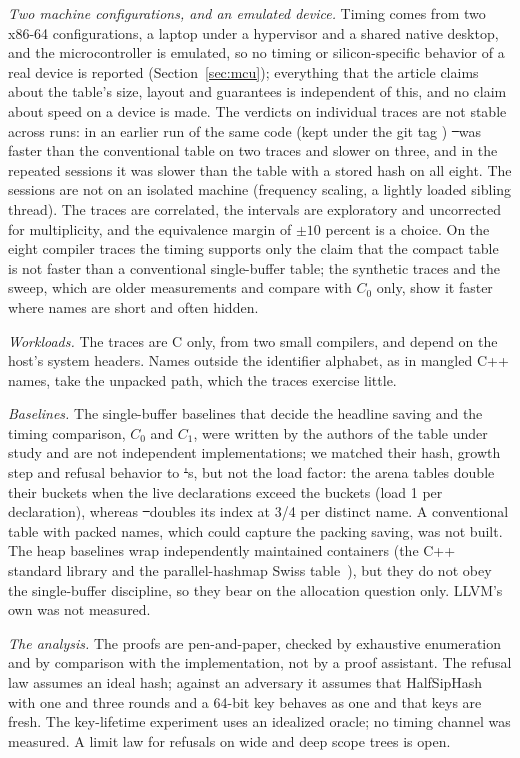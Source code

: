 \emph{Two machine configurations, and an emulated device.} Timing comes from two x86-64 configurations, a laptop under a hypervisor and a shared native desktop, and the microcontroller is emulated, so no timing or silicon-specific behavior of a real device is reported (Section~\ref{sec:mcu}); everything that the article claims about the table's size, layout and guarantees is independent of this, and no claim about speed on a device is made. The verdicts on individual traces are not stable across runs: in an earlier run of the same code (kept under the git tag ) \st\ was faster than the conventional table on two traces and slower on three, and in the repeated sessions it was slower than the table with a stored hash on all eight. The sessions are not on an isolated machine (frequency scaling, a lightly loaded sibling thread). The traces are correlated, the intervals are exploratory and uncorrected for multiplicity, and the equivalence margin of $\pm10$ percent is a choice. On the eight compiler traces the timing supports only the claim that the compact table is not faster than a conventional single-buffer table; the synthetic traces and the sweep, which are older measurements and compare with $C_0$ only, show it faster where names are short and often hidden.

\emph{Workloads.} The traces are C only, from two small compilers, and depend on the host's system headers. Names outside the identifier alphabet, as in mangled C++ names, take the unpacked path, which the traces exercise little.

\emph{Baselines.} The single-buffer baselines that decide the headline saving and the timing comparison, $C_0$ and $C_1$, were written by the authors of the table under study and are not independent implementations; we matched their hash, growth step and refusal behavior to \st's, but not the load factor: the arena tables double their buckets when the live declarations exceed the buckets (load 1 per declaration), whereas \st\ doubles its index at 3/4 per distinct name. A conventional table with packed names, which could capture the packing saving, was not built. The heap baselines wrap independently maintained containers (the C++ standard library and the parallel-hashmap Swiss table~\cite{phmap}), but they do not obey the single-buffer discipline, so they bear on the allocation question only. LLVM's own  was not measured.

\emph{The analysis.} The proofs are pen-and-paper, checked by exhaustive enumeration and by comparison with the implementation, not by a proof assistant. The refusal law assumes an ideal hash; against an adversary it assumes that HalfSipHash with one and three rounds and a 64-bit key behaves as one and that keys are fresh. The key-lifetime experiment uses an idealized oracle; no timing channel was measured. A limit law for refusals on wide and deep scope trees is open.

